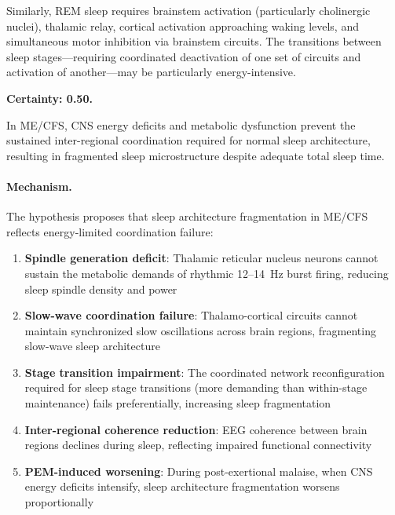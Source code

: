 Similarly, REM sleep requires brainstem activation (particularly cholinergic nuclei), thalamic relay, cortical activation approaching waking levels, and simultaneous motor inhibition via brainstem circuits. The transitions between sleep stages---requiring coordinated deactivation of one set of circuits and activation of another---may be particularly energy-intensive.

\begin{hypothesis}
\label{hyp:sleep-architecture-failure}
\textbf{Certainty: 0.50.}

In ME/CFS, CNS energy deficits and metabolic dysfunction prevent the sustained inter-regional coordination required for normal sleep architecture, resulting in fragmented sleep microstructure despite adequate total sleep time.

\paragraph{Mechanism.}
The hypothesis proposes that sleep architecture fragmentation in ME/CFS reflects energy-limited coordination failure:

\begin{enumerate}
    \item \textbf{Spindle generation deficit}: Thalamic reticular nucleus neurons cannot sustain the metabolic demands of rhythmic 12--14~Hz burst firing, reducing sleep spindle density and power

    \item \textbf{Slow-wave coordination failure}: Thalamo-cortical circuits cannot maintain synchronized slow oscillations across brain regions, fragmenting slow-wave sleep architecture

    \item \textbf{Stage transition impairment}: The coordinated network reconfiguration required for sleep stage transitions (more demanding than within-stage maintenance) fails preferentially, increasing sleep fragmentation

    \item \textbf{Inter-regional coherence reduction}: EEG coherence between brain regions declines during sleep, reflecting impaired functional connectivity~\cite{Sherlin2011coherence}

    \item \textbf{PEM-induced worsening}: During post-exertional malaise, when CNS energy deficits intensify, sleep architecture fragmentation worsens proportionally
\end{enumerate}


\end{hypothesis}
